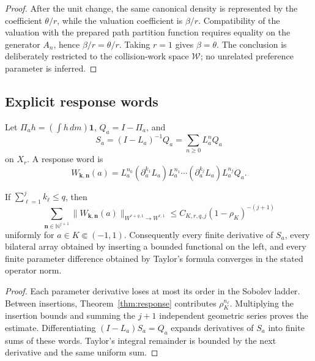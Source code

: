 \begin{proof}
After the unit change, the same canonical density is represented by the
coefficient \(\theta/r\), while the valuation coefficient is \(\beta/r\).
Compatibility of the valuation with the prepared path partition function
requires equality on the generator \(A_n\), hence \(\beta/r=\theta/r\).
Taking \(r=1\) gives \(\beta=\theta\).  The conclusion is deliberately
restricted to the collision-work space \(\mathcal W\); no unrelated
preference parameter is inferred.
\end{proof}

\subsection{Explicit response words}

Let \(\Pi_a h=(\int h\,dm)\mathbf1\), \(Q_a=I-\Pi_a\), and
\[
 S_a=(I-L_a)^{-1}Q_a=\sum_{n\ge0}L_a^nQ_a
\]
on \(X_r\).  A response word is
\[
 W_{\mathbf k,\mathbf n}(a)
 =
 L_a^{n_0}(\partial_a^{k_1}L_a)L_a^{n_1}\cdots
 (\partial_a^{k_j}L_a)L_a^{n_j}Q_a .
\]

\begin{proposition}
\label{prop:rr2-a1-words}
If \(\sum_{\ell=1}^j k_\ell\le q\), then
\[
 \sum_{\mathbf n\in\mathbb N^{j+1}}
 \|W_{\mathbf k,\mathbf n}(a)\|_
 {W^{r+q,1}\to W^{r,1}}
 \le
 C_{K,r,q,j}(1-\rho_K)^{-(j+1)}
\]
uniformly for \(a\in K\Subset(-1,1)\).  Consequently every finite derivative
of \(S_a\), every bilateral array obtained by inserting a bounded functional
on the left, and every finite parameter difference obtained by Taylor's
formula converges in the stated operator norm.
\end{proposition}

\begin{proof}
Each parameter derivative loses at most its order in the Sobolev ladder.
Between insertions, Theorem~\ref{thm:response} contributes
\(\rho_K^{n_\ell}\).  Multiplying the insertion bounds and summing the
\(j+1\) independent geometric series proves the estimate.  Differentiating
\((I-L_a)S_a=Q_a\) expands derivatives of \(S_a\) into finite sums of these
words.  Taylor's integral remainder is bounded by the next derivative and
the same uniform sum.
\end{proof}
